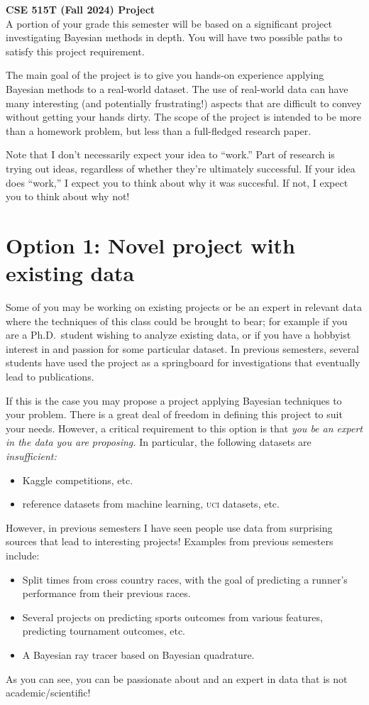 \documentclass{article}
\newcommand{\acro}[1]{\textsc{\MakeLowercase{#1}}}
\begin{document}
{\large \textbf{CSE 515T (Fall 2024) Project}} \\

A portion of your grade this semester will be based on a significant project
investigating Bayesian methods in depth. You will have two possible paths to
satisfy this project requirement.

The main goal of the project is to give you hands-on experience applying
Bayesian methods to a real-world dataset.  The use of real-world data can have
many interesting (and potentially frustrating!) aspects that are difficult to
convey without getting your hands dirty.  The scope of the project is intended
to be more than a homework problem, but less than a full-fledged research paper.

Note that I don't necessarily expect your idea to ``work.''  Part of research is
trying out ideas, regardless of whether they're ultimately successful.  If your
idea does ``work,'' I expect you to think about why it was succesful.  If not, I
expect you to think about why not!

\clearpage

\section*{Option 1: Novel project with existing data}

Some of you may be working on existing projects or be an expert in relevant data
where the techniques of this class could be brought to bear; for example if you
are a Ph.D.\ student wishing to analyze existing data, or if you have a hobbyist
interest in and passion for some particular dataset. In previous semesters,
several students have used the project as a springboard for investigations that
eventually lead to publications.

If this is the case you may propose a project applying Bayesian techniques to
your problem. There is a great deal of freedom in defining this project to suit
your needs. However, a critical requirement to this option is that \emph{you be
  an expert in the data you are proposing.} In particular, the following
datasets are \emph{insufficient:}
\begin{itemize}
\item Kaggle competitions, etc.
\item reference datasets from machine learning, \acro{UCI} datasets, etc.
\end{itemize}

However, in previous semesters I have seen people use data from surprising
sources that lead to interesting projects! Examples from previous semesters
include:
\begin{itemize}
\item Split times from cross country races, with the goal of predicting a
  runner's performance from their previous races.
\item Several projects on predicting sports outcomes from various features,
  predicting tournament outcomes, etc.
\item
  A Bayesian ray tracer based on Bayesian quadrature.
\end{itemize}
As you can see, you can be passionate about and an expert in data that is not
academic/scientific!
\end{document}
